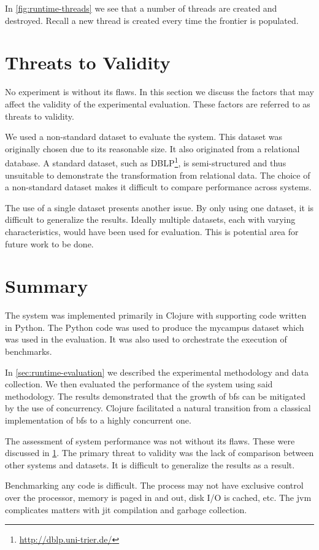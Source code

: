				In \cref{fig:runtime-threads} we see that a number of threads are created and destroyed.  Recall a new thread is created every time the frontier is populated.
	
	\section{Threats to Validity}
	\label{sec:threats-to-validity}
		No experiment is without its flaws.  In this section we discuss the factors that may affect the validity of the experimental evaluation.  These factors are referred to as threats to validity.
		
		We used a non-standard dataset to evaluate the system.  This dataset was originally chosen due to its reasonable size.  It also originated from a relational database.  A standard dataset, such as DBLP\footnote{\url{http://dblp.uni-trier.de/}}, is semi-structured and thus unsuitable to demonstrate the transformation from relational data.  The choice of a non-standard dataset makes it difficult to compare performance across systems.
		
		The use of a single dataset presents another issue.  By only using one dataset, it is difficult to generalize the results.  Ideally multiple datasets, each with varying characteristics, would have been used for evaluation.  This is potential area for future work to be done.
	
	\section{Summary}
	\label{sec:eval-summary}
		The system was implemented primarily in Clojure with supporting code written in Python.  The Python code was used to produce the mycampus dataset which was used in the evaluation.  It was also used to orchestrate the execution of benchmarks.
		
		In \cref{sec:runtime-evaluation} we described the experimental methodology and data collection.  We then evaluated the performance of the system using said methodology.  The results demonstrated that the growth of \gls{bfs} can be mitigated by the use of concurrency.  Clojure facilitated a natural transition from a classical implementation of \gls{bfs} to a highly concurrent one.
		
		The assessment of system performance was not without its flaws.  These were discussed in \cref{sec:threats-to-validity}.  The primary threat to validity was the lack of comparison between other systems and datasets.  It is difficult to generalize the results as a result.
		
		Benchmarking any code is difficult.  The process may not have exclusive control over the processor, memory is paged in and out, disk I/O is cached, etc.  The \gls{jvm} complicates matters with \gls{jit} compilation and garbage collection.
		

